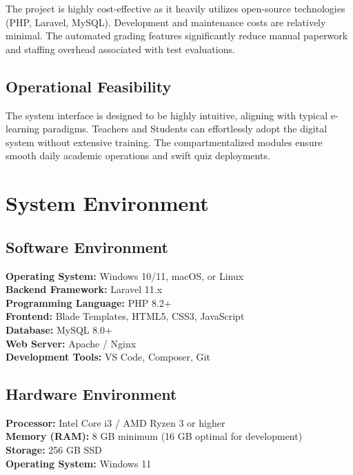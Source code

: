 The project is highly cost-effective as it heavily utilizes open-source technologies (PHP, Laravel, MySQL). Development and maintenance costs are relatively minimal. The automated grading features significantly reduce manual paperwork and staffing overhead associated with test evaluations.

\subsection{Operational Feasibility}

The system interface is designed to be highly intuitive, aligning with typical e-learning paradigms. Teachers and Students can effortlessly adopt the digital system without extensive training. The compartmentalized modules ensure smooth daily academic operations and swift quiz deployments.

\section{System Environment}

\subsection{Software Environment}

\textbf{Operating System:} Windows 10/11, macOS, or Linux \\
\textbf{Backend Framework:} Laravel 11.x \\
\textbf{Programming Language:} PHP 8.2+ \\
\textbf{Frontend:} Blade Templates, HTML5, CSS3, JavaScript \\
\textbf{Database:} MySQL 8.0+ \\
\textbf{Web Server:} Apache / Nginx \\
\textbf{Development Tools:} VS Code, Composer, Git \\

\subsection{Hardware Environment}

\textbf{Processor:} Intel Core i3 / AMD Ryzen 3 or higher \\
\textbf{Memory (RAM):} 8 GB minimum (16 GB optimal for development) \\
\textbf{Storage:} 256 GB SSD \\
\textbf{Operating System:} Windows 11 \\

